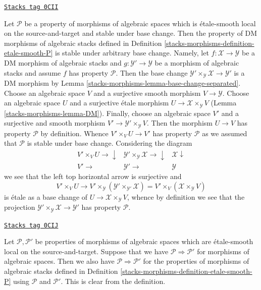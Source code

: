 \begin{remark}
\label{stacks-morphisms-remark-etale-smooth-base-change}
\href{https://stacks.math.columbia.edu/tag/0CII}{\texttt{Stacks tag 0CII}}

Let $\mathcal{P}$ be a property of morphisms of algebraic spaces
which is \'etale-smooth local on the source-and-target and
stable under base change. Then the property of
DM morphisms of algebraic stacks defined in
Definition \ref{stacks-morphisms-definition-etale-smooth-P}
is stable under arbitrary base change.
Namely, let $f : \mathcal{X} \to \mathcal{Y}$
be a DM morphism of algebraic stacks
and $g : \mathcal{Y}' \to \mathcal{Y}$ be a morphism of algebraic stacks
and assume $f$ has property $\mathcal{P}$.
Then the base change
$\mathcal{Y}' \times_\mathcal{Y} \mathcal{X} \to \mathcal{Y}'$
is a DM morphism by Lemma \ref{stacks-morphisms-lemma-base-change-separated}.
Choose an algebraic space $V$
and a surjective smooth morphism $V \to \mathcal{Y}$. Choose an algebraic
space $U$ and a surjective \'etale morphism
$U \to \mathcal{X} \times_\mathcal{Y} V$ (Lemma \ref{stacks-morphisms-lemma-DM}).
Finally, choose an algebraic space
$V'$ and a surjective and smooth morphism
$V' \to \mathcal{Y}' \times_\mathcal{Y} V$. Then the morphism
$U \to V$ has property $\mathcal{P}$ by definition.
Whence $V' \times_V U \to V'$ has property $\mathcal{P}$ as we assumed that
$\mathcal{P}$ is stable under base change. Considering the diagram
$$
\begin{array}{ccc}V' \times_V U \longrightarrow\downarrow & \mathcal{Y}' \times_\mathcal{Y} \mathcal{X} \longrightarrow\downarrow & \mathcal{X} \downarrow \\ V' \longrightarrow & \mathcal{Y}' \longrightarrow & \mathcal{Y}\end{array}
$$
we see that the left top horizontal arrow is surjective and
$$
V' \times_V U \to V' \times_\mathcal{Y}
(\mathcal{Y}' \times_{\mathcal{Y}'} \mathcal{X}) =
V' \times_V (\mathcal{X} \times_\mathcal{Y} V)
$$
is \'etale as a base change of $U \to \mathcal{X} \times_\mathcal{Y} V$,
whence by definition we see that the projection
$\mathcal{Y}' \times_\mathcal{Y} \mathcal{X} \to \mathcal{Y}'$ has
property $\mathcal{P}$.
\end{remark}

\begin{remark}
\label{stacks-morphisms-remark-etale-smooth-implication}
\href{https://stacks.math.columbia.edu/tag/0CIJ}{\texttt{Stacks tag 0CIJ}}

Let $\mathcal{P}, \mathcal{P}'$ be properties of morphisms of algebraic spaces
which are \'etale-smooth local on the source-and-target.
Suppose that we have $\mathcal{P} \Rightarrow \mathcal{P}'$ for morphisms
of algebraic spaces. Then we also have $\mathcal{P} \Rightarrow \mathcal{P}'$
for the properties of morphisms of algebraic stacks defined in
Definition \ref{stacks-morphisms-definition-etale-smooth-P}
using $\mathcal{P}$ and $\mathcal{P}'$. This is clear from the definition.
\end{remark}

